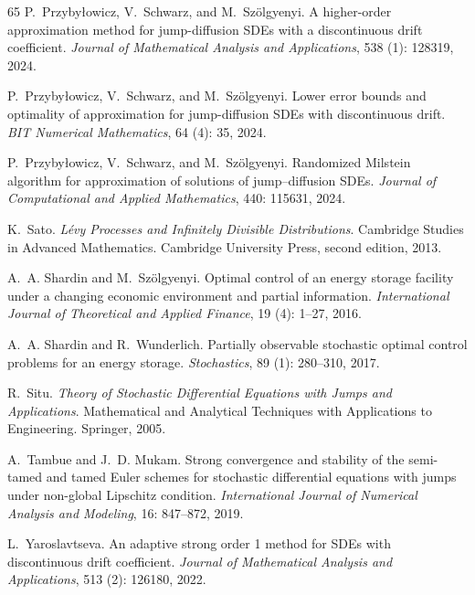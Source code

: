 \documentclass[11pt,a4paper]{article}
\numberwithin{equation}{section}
\theoremstyle{definition}
\begin{document}
{\begin{thebibliography}{65}
P.~Przyby{\l}owicz, V.~Schwarz, and M.~Sz{\"o}lgyenyi.
\newblock A higher-order approximation method for jump-diffusion {SDE}s with a discontinuous drift coefficient.
\newblock \emph{Journal of Mathematical Analysis and Applications}, 538 (1): 128319, 2024{}.

P.~Przyby{\l}owicz, V.~Schwarz, and M.~Sz{\"o}lgyenyi.
\newblock Lower error bounds and optimality of approximation for jump-diffusion {SDE}s with discontinuous drift.
\newblock \emph{BIT Numerical Mathematics}, 64 (4): 35, 2024{}.

P.~Przyby{\l}owicz, V.~Schwarz, and M.~Sz{\"o}lgyenyi.
\newblock Randomized {M}ilstein algorithm for approximation of solutions of jump--diffusion {SDE}s.
\newblock \emph{Journal of Computational and Applied Mathematics}, 440: 115631, 2024{}.

K.~Sato.
\newblock \emph{Lévy {P}rocesses and {I}nfinitely {D}ivisible {D}istributions}.
\newblock Cambridge Studies in Advanced Mathematics. Cambridge University Press, second edition, 2013.

A.~A. Shardin and M.~Sz\"olgyenyi.
\newblock Optimal control of an energy storage facility under a changing economic environment and partial information.
\newblock \emph{International Journal of Theoretical and Applied Finance}, 19 (4): 1--27, 2016.

A.~A. Shardin and R.~Wunderlich.
\newblock Partially observable stochastic optimal control problems for an energy storage.
\newblock \emph{Stochastics}, 89 (1): 280--310, 2017.

R.~Situ.
\newblock \emph{Theory of Stochastic Differential Equations with Jumps and Applications}.
\newblock Mathematical and Analytical Techniques with Applications to Engineering. Springer, 2005.

A.~Tambue and J.~D. Mukam.
\newblock Strong convergence and stability of the semi-tamed and tamed {E}uler schemes for stochastic differential equations with jumps under non-global {L}ipschitz condition.
\newblock \emph{International Journal of Numerical Analysis and Modeling}, 16: 847--872, 2019.

L.~Yaroslavtseva.
\newblock An adaptive strong order 1 method for {SDE}s with discontinuous drift coefficient.
\newblock \emph{Journal of Mathematical Analysis and Applications}, 513 (2): 126180, 2022.

\end{thebibliography}
}
\end{document}
